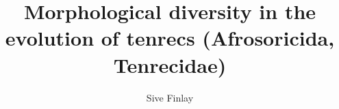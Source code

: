 \documentclass[twoside,12pt]{mythesis} %
\title{Morphological diversity in the evolution of tenrecs (Afrosoricida, Tenrecidae)}
\author{Sive Finlay}
\begin{document}
\maketitle %

\allcontents %
\cleardoublepage
\mainbody

 
	



\formatbibliography 
 


\formatappendices
\end{document}
